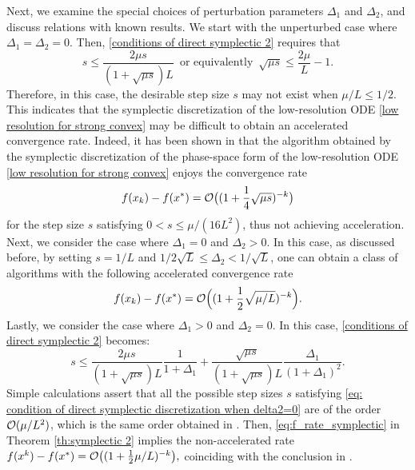 \documentclass[11pt]{article}
\newcommand{\1}{\mathbf 1}
\numberwithin{equation}{section}
\begin{document}
Next, we examine the special choices of perturbation parameters $\Delta_1$ and $\Delta_2$, and discuss relations with known results. We start with the unperturbed case where $\Delta_1 = \Delta_2=0$. Then, 
\eqref{conditions of direct symplectic 2} requires that
\begin{equation}
    \label{eq: conditions for direct symplectic when delta1=delta2=0}
    s\leqslant \frac{2\mu s}{(1+\sqrt{\mu s})L} \, \mbox{ or equivalently } \, \sqrt{\mu s} \leqslant \frac{2\mu}{L} - 1.
\end{equation}
Therefore, in this case, the desirable step size $s$ may not exist when $\mu/L \leqslant 1/2$. This indicates that the symplectic discretization of the low-resolution ODE \eqref{low resolution for strong convex} may be difficult to obtain an accelerated convergence rate. 
Indeed, it has been shown in \cite{Shi_2019_acceleration} that the algorithm obtained by the symplectic discretization of the phase-space form of the low-resolution ODE \eqref{low resolution for strong convex} enjoys the convergence rate \[f(x_k)-f(x^*)={\cal O}\big((1+\frac{1}{4}\sqrt{\mu s})^{-k}\big)\] for the step size $s$ satisfying $0<s\leqslant \mu/(16L^2)$, thus not achieving acceleration. Next, we consider the case where $\Delta_1 = 0$ and $\Delta_2 >0$. In this case, as discussed before, by setting $s = 1/L$ and $1/2\sqrt{L} \leqslant \Delta_2 < 1/\sqrt{L}$, one can obtain a class of algorithms with the following accelerated convergence rate 
\[f(x_k) - f(x^*) = {\cal O}\Big((1+\frac{1}{2}\sqrt{\mu/L})^{-k}\Big). \]
Lastly, we consider the case where $\Delta_1 >0$ and $\Delta_2 = 0$. In this case, 
\eqref{conditions of direct symplectic 2} becomes:
\begin{equation}
    \label{eq: condition of direct symplectic discretization when delta2=0}
    s\leqslant \frac{2\mu s}{(1+\sqrt{\mu s})L}\frac{1}{1+\Delta_1}+\frac{\sqrt{\mu s}}{(1+\sqrt{\mu s})L}\frac{\Delta_1}{(1+\Delta_1)^2}.
\end{equation}
Simple calculations assert that all the possible step sizes $s$ satisfying \eqref{eq: condition of direct symplectic discretization when delta2=0} are of the order ${\cal O}(\mu/L^2)$, which is the same order obtained in  \cite[Theorem 3.2(a)]{Shi_2019_acceleration}. Then, \eqref{eq:f_rate_symplectic} in Theorem \ref{th:symplectic 2} implies the non-accelerated rate
$
f(x^k) - f(x^*) = {\cal O}\big( (1 + \frac{1}{2} \mu/L)^{-k}\big),
$
coinciding with the conclusion in \cite[Theorem 3.2(a)]{Shi_2019_acceleration}.
\end{document}
